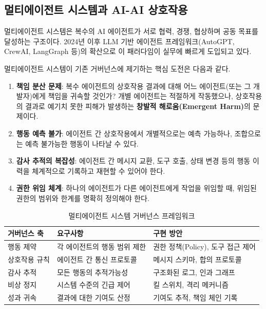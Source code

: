 \subsection{멀티에이전트 시스템과 AI-AI 상호작용}
\label{sec:20.1.2}

멀티에이전트 시스템은 복수의 AI 에이전트가 서로 협력, 경쟁, 협상하며 공동 목표를 달성하는 구조이다. 2024년 이후 LLM 기반 에이전트 프레임워크(AutoGPT, CrewAI, LangGraph 등)의 확산으로 이 패러다임이 실무에 빠르게 도입되고 있다.

멀티에이전트 시스템이 기존 거버넌스에 제기하는 핵심 도전은 다음과 같다.

\begin{enumerate}
 \item \textbf{책임 분산 문제}: 복수 에이전트의 상호작용 결과에 대해 어느 에이전트(또는 그 개발자)에게 책임을 귀속할 것인가? 개별 에이전트는 적절하게 작동했으나, 상호작용의 결과로 예기치 못한 피해가 발생하는 \textbf{창발적 해로움(Emergent Harm)}의 문제이다.
 \item \textbf{행동 예측 불가}: 에이전트 간 상호작용에서 개별적으로는 예측 가능하나, 조합으로는 예측 불가능한 행동이 나타날 수 있다.
 \item \textbf{감사 추적의 복잡성}: 에이전트 간 메시지 교환, 도구 호출, 상태 변경 등의 행동 이력을 체계적으로 기록하고 재현할 수 있어야 한다.
 \item \textbf{권한 위임 체계}: 하나의 에이전트가 다른 에이전트에게 작업을 위임할 때, 위임된 권한의 범위와 한계를 명확히 정의해야 한다.
\end{enumerate}

\begin{table}[htbp]
\centering
\caption{멀티에이전트 시스템 거버넌스 프레임워크}
\label{tab:20_multi}
\begin{tabularx}{\textwidth}{p{2.5cm}Xp{5cm}}
\toprule
\textbf{거버넌스 축} & \textbf{요구사항} & \textbf{구현 방안} \\
\midrule
행동 제약 & 각 에이전트의 행동 범위 제한 & 권한 정책(Policy), 도구 접근 제어 \\
상호작용 규칙 & 에이전트 간 통신 프로토콜 & 메시지 스키마, 합의 프로토콜 \\
감사 추적 & 모든 행동의 추적가능성 & 구조화된 로그, 인과 그래프 \\
비상 정지 & 시스템 수준의 긴급 제어 & 킬 스위치, 격리 메커니즘 \\
성과 귀속 & 결과에 대한 기여도 산정 & 기여도 추적, 책임 체인 기록 \\
\bottomrule
\end{tabularx}
\end{table}

